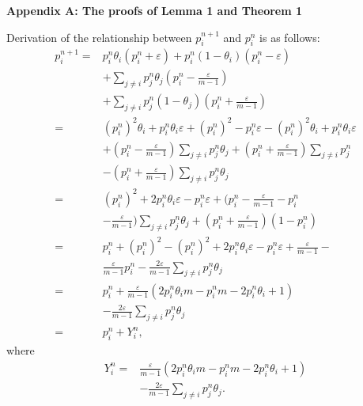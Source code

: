 \documentclass[10pt,journal,cspaper,compsoc,onecolumn]{IEEEtran}
\begin{document}
\begin{spacing}{1.2}

\large{\textbf{Appendix A: The proofs of Lemma 1 and Theorem 1}}

Derivation of the relationship between $p_i^{n + 1}$ and $p_i^{n}$ is as follows:
\begin{equation}
    \label{eq:7}
    \begin{split}
    p_i^{n + 1} = &p_i^n\theta_i(p_i^n + \varepsilon) + p_i^n(1-\theta_i)(p_i^n - \varepsilon)\\
    &+ \sum_{j \neq i}p_j^n\theta_j(p_i^n - \displaystyle \frac{\varepsilon}{m- 1})\\
    &+ \sum_{j \neq i}p_j^n(1 - \theta_j)(p_i^n + \displaystyle\frac{\varepsilon}{m - 1})\\
    =&(p_i^n)^2\theta_i + p_i^n\theta_i\varepsilon + (p_i^n)^2 - p_i^n\varepsilon - (p_i^n)^2\theta_i + p_i^n\theta_i\varepsilon\\
    & + (p_i^n - \displaystyle\frac{\varepsilon}{m - 1})\sum_{j \neq i}p_j^n\theta_j + (p_i^n + \displaystyle\frac{\varepsilon}{m - 1})\sum_{j \neq i}p_j^n\\
    &- (p_i^n + \displaystyle\frac{\varepsilon}{m - 1})\sum_{j \neq i}p_j^n\theta_j\\
    =&(p_i^n)^2 + 2p_i^n\theta_i\varepsilon - p_i^n\varepsilon + (p_i^n - \displaystyle\frac{\varepsilon}{m - 1} - p_i^n \\
    &- \displaystyle\frac{\varepsilon}{m - 1})\sum_{j \neq i}p_j^n\theta_j + (p_i^n + \displaystyle\frac{\varepsilon}{m - 1})(1 - p_i^n)\\
    =&p_i^n + (p_i^n)^2 - (p_i^n)^2 + 2p_i^n\theta_i\varepsilon - p_i^n\varepsilon + \displaystyle\frac{\varepsilon}{m - 1} - \\
    &\displaystyle\frac{\varepsilon}{m - 1}p_i^n - \displaystyle\frac{2\varepsilon}{m - 1}\sum_{j \neq i}p_j^n\theta_j\\
    =&p_i^n + \displaystyle\frac{\varepsilon}{m - 1}(2p_i^n\theta_im - p_i^nm - 2p_i^n\theta_i + 1 )\\
    &- \displaystyle\frac{2\varepsilon}{m-1}\sum_{j \neq i}p_j^n\theta_j\\
    =&p_i^n + Y_i^n,
    \end{split}
\end{equation}
where
\begin{equation}
    \begin{split}
    \label{eq:yi}
    Y_i^n = &\displaystyle\frac{\varepsilon}{m - 1}(2p_i^n\theta_im - p_i^nm - 2p_i^n\theta_i + 1 )\\
             &- \displaystyle\frac{2\varepsilon}{m-1}\sum_{j \neq i}p_j^n\theta_j.
    \end{split}
 \end{equation}


\end{spacing}
\end{document}

